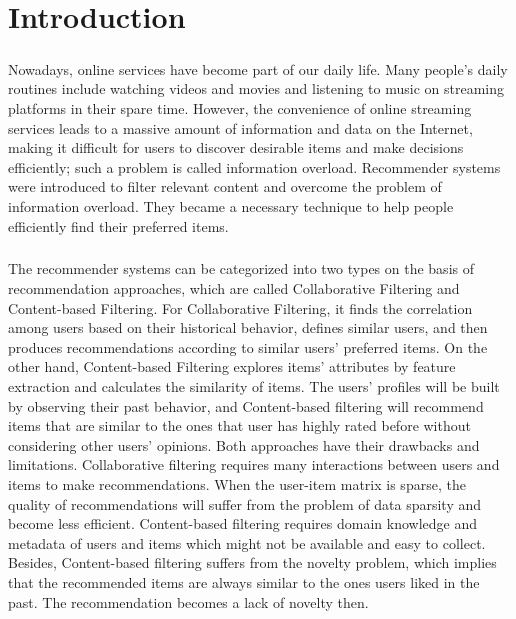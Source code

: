\documentclass[a4paper,12pt]{report}
\begin{document}
\setcounter{page}{4}
\tableofcontents \newpage
{}
\listoffigures \newpage
{}
\listoftables \newpage
{}

\setcounter{page}{1}

\chapter{Introduction}

\paragraph{}
Nowadays, online services have become part of our daily life. Many people's daily routines include watching videos and movies and listening to music on streaming platforms in their spare time. However, the convenience of online streaming services leads to a massive amount of information and data on the Internet, making it difficult for users to discover desirable items and make decisions efficiently; such a problem is called information overload. Recommender systems were introduced to filter relevant content and overcome the problem of information overload. They became a necessary technique to help people efficiently find their preferred items.
\paragraph{}
The recommender systems can be categorized into two types on the basis of recommendation approaches, which are called Collaborative Filtering\cite{bellogin2014neighbor,breese2013empirical,sarwar2001item,linden2003amazon, bennett2007netflix} and Content-based Filtering\cite{pazzani2007content,van2000using,cantador2010content,basu1998recommendation}. For Collaborative Filtering, it finds the correlation among users based on their historical behavior, defines similar users, and then produces recommendations according to similar users' preferred items. On the other hand, Content-based Filtering explores items' attributes by feature extraction and calculates the similarity of items. The users' profiles will be built by observing their past behavior, and Content-based filtering will recommend items that are similar to the ones that user has highly rated before without considering other users' opinions. Both approaches have their drawbacks and limitations. Collaborative filtering requires many interactions between users and items to make recommendations. When the user-item matrix is sparse,  the quality of recommendations will suffer from the problem of data sparsity and become less efficient. Content-based filtering requires domain knowledge and metadata of users and items which might not be available and easy to collect. Besides, Content-based filtering suffers from the novelty problem, which implies that the recommended items are always similar to the ones users liked in the past. The recommendation becomes a lack of novelty then.
\end{document}
